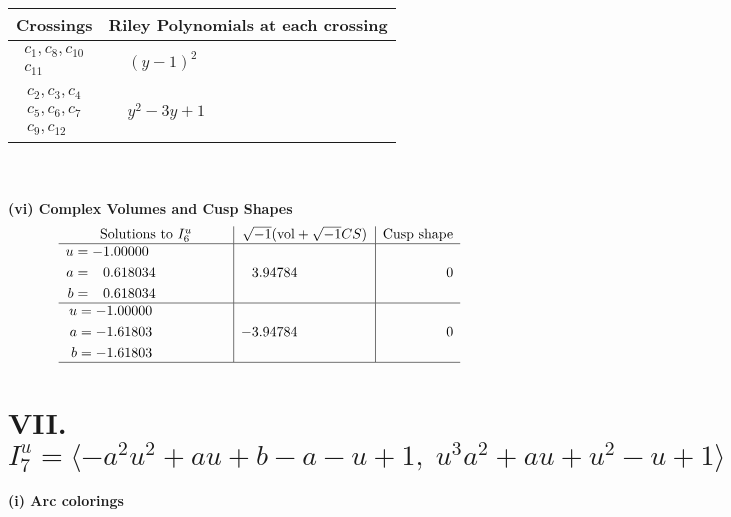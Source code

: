 \documentclass[1p]{elsarticle_modified}
\theoremstyle{definition}
\newcommand{\I}{\sqrt{-1}}
\begin{document}
\begin{tabular}{m{50pt}|m{274pt}}
Crossings & \hspace{64pt}Riley Polynomials at each crossing \\
\hline $$\begin{aligned}c_{1},c_{8},c_{10}\\c_{11}\end{aligned}$$&$\begin{aligned}
&(y-1)^2
\end{aligned}$\\
\hline $$\begin{aligned}c_{2},c_{3},c_{4}\\c_{5},c_{6},c_{7}\\c_{9},c_{12}\end{aligned}$$&$\begin{aligned}
&y^2-3 y+1
\end{aligned}$\\
\hline
\end{tabular}\\~\\
\newpage\flushleft \textbf{(vi) Complex Volumes and Cusp Shapes}
$$\begin{array}{c|c|c}  
\text{Solutions to }I^u_{6}& \I (\text{vol} + \sqrt{-1}CS) & \text{Cusp shape}\\
 \hline 
\begin{aligned}
u &= -1.00000\phantom{ +0.000000I} \\
a &= \phantom{-}0.618034\phantom{ +0.000000I} \\
b &= \phantom{-}0.618034\phantom{ +0.000000I}\end{aligned}
 & \phantom{-}3.94784\phantom{ +0.000000I} & \phantom{-0.000000 } 0 \\ \hline\begin{aligned}
u &= -1.00000\phantom{ +0.000000I} \\
a &= -1.61803\phantom{ +0.000000I} \\
b &= -1.61803\phantom{ +0.000000I}\end{aligned}
 & -3.94784\phantom{ +0.000000I} & \phantom{-0.000000 } 0\\
 \hline 
 \end{array}$$\newpage\newpage\renewcommand{\arraystretch}{1}
\centering \section*{VII. $I^u_{7}= \langle - a^2 u^2+a u+b- a- u+1,\;u^3 a^2+a u+u^2- u+1 \rangle$}
\flushleft \textbf{(i) Arc colorings}\\
\end{document}
